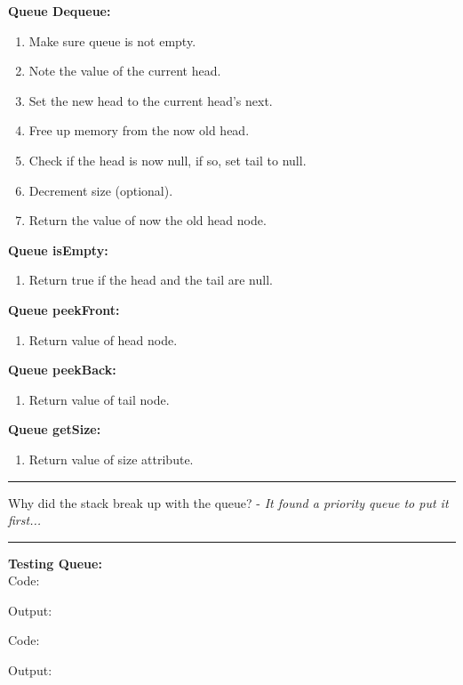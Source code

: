 \documentclass[letterpaper, 10pt]{article}
\begin{document}
\textbf{Queue Dequeue:}
\begin{enumerate}
    \item Make sure queue is not empty.
    \item Note the value of the current head.
    \item Set the new head to the current head's next.
    \item Free up memory from the now old head.
    \item Check if the head is now null, if so, set tail to null.
    \item Decrement size (optional). 
    \item Return the value of now the old head node.
\end{enumerate}


\textbf{Queue isEmpty:}
\begin{enumerate}
    \item Return true if the head and the tail are null.
\end{enumerate}
\textbf{Queue peekFront:}
\begin{enumerate}
    \item Return value of head node.
\end{enumerate}
\textbf{Queue peekBack:}
\begin{enumerate}
    \item Return value of tail node.
\end{enumerate}
\textbf{Queue getSize:}
\begin{enumerate}
    \item Return value of size attribute.
\end{enumerate}

\hrule
\vspace{.25cm}
Why did the stack break up with the queue? - \textit{It found a priority queue to put it first...}\\
\hrule
\vspace{.25cm}

\textbf{Testing Queue: } \\ 
Code:

Output:

Code: 

Output:

\end{document}
